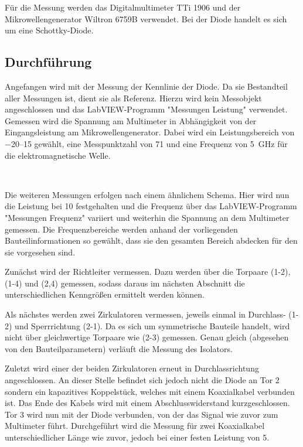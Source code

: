 	Für die Messung werden das Digitalmultimeter TTi 1906 und der Mikrowellengenerator Wiltron 6759B verwendet.
	Bei der Diode handelt es sich um eine Schottky-Diode.
	
\subsection*{Durchführung}

	Angefangen wird mit der Messung der Kennlinie der Diode.
	Da sie Bestandteil aller Messungen ist, dient sie als Referenz.
	Hierzu wird kein Messobjekt angeschlossen und das LabVIEW-Programm "Messungen Leistung" verwendet.
	Gemessen wird die Spannung am Multimeter in Abhängigkeit von der Eingangsleistung am Mikrowellengenerator.
	Dabei wird ein Leistungsbereich von \SIrange{-20}{15}{\decibelmilliwatt} gewählt, eine Messpunktzahl von 71 und eine Frequenz von \SI{5}{\giga\hertz} für die elektromagnetische Welle.
	
	\
	
	Die weiteren Messungen erfolgen nach einem ähnlichem Schema.
	Hier wird nun die Leistung bei \SI{10}{\decibelmilliwatt} festgehalten und die Frequenz über das LabVIEW-Programm "Messungen Frequenz" variiert und weiterhin die Spannung an dem Multimeter gemessen.
	Die Frequenzbereiche werden anhand der vorliegenden Bauteilinformationen so gewählt, dass sie den gesamten Bereich abdecken für den sie vorgesehen sind.
	
	Zunächst wird der Richtleiter vermessen.
	Dazu werden über die Torpaare (1-2), (1-4) und (2,4) gemessen, sodass daraus im nächsten Abschnitt die unterschiedlichen Kenngrößen ermittelt werden können.
	
	Als nächstes werden zwei Zirkulatoren vermessen, jeweils einmal in Durchlass- (1-2) und Sperrrichtung (2-1).
	Da es sich um symmetrische Bauteile handelt, wird nicht über gleichwertige Torpaare wie (2-3) gemessen.
	Genau gleich (abgesehen von den Bauteilparametern) verläuft die Messung des Isolators.
	
	Zuletzt wird einer der beiden Zirkulatoren erneut in Durchlassrichtung angeschlossen.
	An dieser Stelle befindet sich jedoch nicht die Diode an Tor 2 sondern ein kapazitives Koppelstück, welches mit einem Koaxialkabel verbunden ist.
	Das Ende des Kabels wird mit einem Abschlusswiderstand kurzgeschlossen.
	Tor 3 wird nun mit der Diode verbunden, von der das Signal wie zuvor zum Multimeter führt.
	Durchgeführt wird die Messung für zwei Koaxialkabel unterschiedlicher Länge wie zuvor, jedoch bei einer festen Leistung von \SI{5}{\decibelmilliwatt}.
	